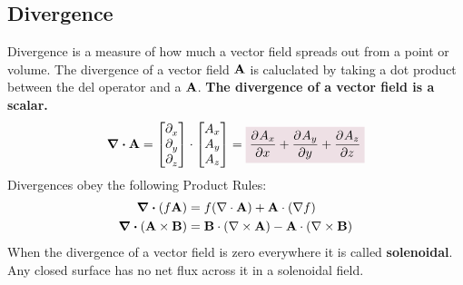     \subsection*{Divergence}
        Divergence is a measure of how much a vector field spreads out from a point or volume.   The divergence of a vector field \(\vb{A}\) is caluclated by taking a dot product between the del operator and a \(\vb{A}\). \textcolor{Blue1}{\bf The divergence of a vector field is a scalar.} 
        \begin{equation}
            \div\vb{A}=
            \qty[
                \begin{matrix}
                    \pder*{x}\\\pder*{y}\\\pder*{z}
                \end{matrix}
            ]\cdot\qty[
                \begin{matrix}
                    A_x\\A_y\\A_z
                \end{matrix}
            ]=
            \coloredanswer{\pder{A_x}{x}+\pder{A_y}{y}+\pder{A_z}{z}}
        \end{equation}
        Divergences obey the following Product Rules:
        {\length[0.25 cm]
        \begin{align*}
            \div(f\vb{A}) &= f(\nabla \cdot \vb{A}) + \vb{A} \cdot (\nabla f)
            \\
            \div{(\vb{A} \times \vb{B})} &= \vb{B} \cdot (\nabla \times \vb{A}) - \vb{A} \cdot (\nabla \times \vb{B})
        \end{align*}
        }
        When the divergence of a vector field is zero everywhere it is called {\bf solenoidal}. Any closed surface has no net flux across it in a solenoidal field.
